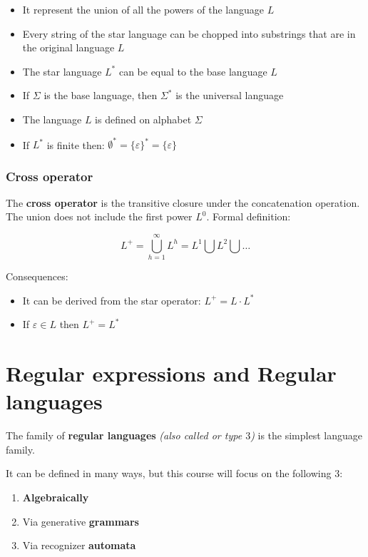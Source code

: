 \documentclass[english]{article}
\begin{document}
\begin{itemize}
  \item It represent the union of all the powers of the language \(L\)
  \item Every string of the star language can be chopped into substrings that are in the original language \(L\)
  \item The star language \(L^\ast\) can be equal to the base language \(L\)
  \item If \(\Sigma\) is the base language, then \(\Sigma^\ast\) is the universal language
  \item The language \(L\) is defined on alphabet \(\Sigma\)
  \item If \(L^\ast\) is finite then: \(\emptyset^\ast = \{\varepsilon\}^\ast = \{\varepsilon\}\)
\end{itemize}

\subsubsection{Cross operator}

The \textbf{cross operator} is the transitive closure under the concatenation operation.
The union does not include the first power \(L^0\).
Formal definition:

\[ L^+ = \bigcup_{h=1}^{\infty} L^h = L^1 \bigcup L^2 \bigcup \ldots \]

\bigskip
Consequences:

\begin{itemize}
  \item It can be derived from the star operator: \(L^+ = L \cdot L^\ast\)
  \item If \(\varepsilon \in L\) then \(L^+ = L^\ast\)
\end{itemize}

\clearpage

\section{Regular expressions and Regular languages}

The family of \textbf{regular languages} \textit{(also called \REG or type \(3\))} is the simplest language family.

It can be defined in many ways, but this course will focus on the following \(3\):

\begin{enumerate}
  \item \textbf{Algebraically}
  \item Via generative \textbf{grammars}
  \item Via recognizer \textbf{automata}
\end{enumerate}
\end{document}
